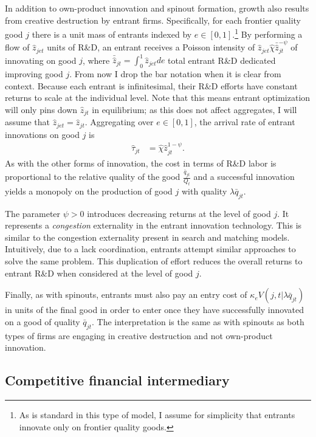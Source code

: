 \documentclass[ecta,nameyear,final]{econsocart}
\theoremstyle{plain}
\theoremstyle{remark}
\begin{document}
In addition to own-product innovation and spinout formation, growth also results from creative destruction by entrant firms. Specifically, for each frontier quality good $j$ there is a unit mass of entrants indexed by $e \in [0,1]$.\footnote{As is standard in this type of model, I assume for simplicity that entrants innovate only on frontier quality goods.} By performing a flow of $\hat{z}_{jet}$ units of R\&D, an entrant receives a Poisson intensity of $\hat{z}_{jet} \hat{\chi} \bar{\hat{z}}_{jt}^{-\psi}$ of innovating on good $j$, where $\bar{\hat{z}}_{jt} = \int_0^1 \hat{z}_{jet} de$ total entrant R\&D dedicated improving good $j$. From now I drop the bar notation when it is clear from context. Because each entrant is infinitesimal, their R\&D efforts have constant returns to scale at the individual level. Note that this means entrant optimization will only pins down $\hat{z}_{jt}$ in equilibrium; as this does not affect aggregates, I will assume that $\hat{z}_{jet} = \hat{z}_{jt}$. Aggregating over $e \in [0,1]$, the arrival rate of entrant innovations on good $j$ is 
\begin{align}\label{model:entrantsInnovationTechnology}
	\hat{\tau}_{jt} &= \hat{\chi} \hat{z}_{jt}^{1-\psi}.
\end{align}
As with the other forms of innovation, the cost in terms of R\&D labor is proportional to the relative quality of the good $\frac{\bar{q}_{jt}}{Q_t}$ and a successful innovation yields a monopoly on the production of good $j$ with quality $\lambda \bar{q}_{jt}$. 

The parameter $\psi > 0$ introduces decreasing returns at the level of good $j$. It represents a \textit{congestion} externality in the entrant innovation technology. This is similar to the congestion externality present in search and matching models. Intuitively, due to a lack coordination, entrants attempt similar approaches to solve the same problem. This duplication of effort reduces the overall returns to entrant R\&D when considered at the level of good $j$. 

Finally, as with spinouts, entrants must also pay an entry cost of $\kappa_{e} V(j,t|\lambda \bar{q}_{jt})$ in units of the final good in order to enter once they have successfully innovated on a good of quality $\bar{q}_{jt}$. The interpretation is the same as with spinouts as both types of firms are engaging in creative destruction and not own-product innovation. 

\subsection{Competitive financial intermediary}\label{model:financial_intermediary}
\end{document}
